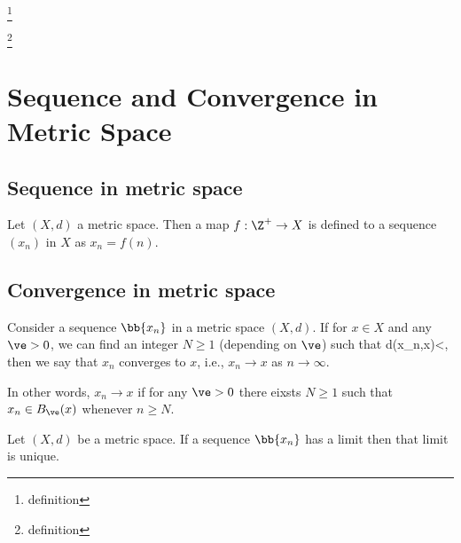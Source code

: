\begin{definition}\label{def:euclidean_metric_space}
\footnote{definition}
\end{definition}

\begin{definition}\label{def:discrete_metric_space}
\footnote{definition}
\end{definition}





\section{Sequence and Convergence in Metric Space}


\subsection{Sequence in metric space}

\begin{definition}\label{def:sequence_metric_space}
Let $(X,d)$ a metric space. Then a map $f:\Z^+\to X$ is defined to a sequence $(x_n)$ in $X$ as $x_n = f(n)$.
\end{definition}

\subsection{Convergence in metric space}

\begin{definition}\label{def:limit_convergence_metric_space}
Consider a sequence $\bb{x_{n}}$ in a metric space $(X,d)$. If for $x\in X$ and any $\ve > 0$, we can find an integer $N\geq 1$ (depending on $\ve$) such that
\be
d(x_{n},x)<\ve \quad {},
\ee
then we say that $x_n$ converges to $x$, i.e., $x_{n} \to x$ as $n\to\infty$.

In other words, $x_{n} \to x$ if for any $\ve>0$ there eixsts $N\geq 1$ such that $x_n\in B_\ve(x)$ whenever $n\geq N$.
\end{definition}

\begin{theorem}\label{thm:limit_unique_metric_space}
Let $(X,d)$ be a metric space. If a sequence $\bb{x_{n}}$ has a limit then that limit is unique.
\end{theorem}

